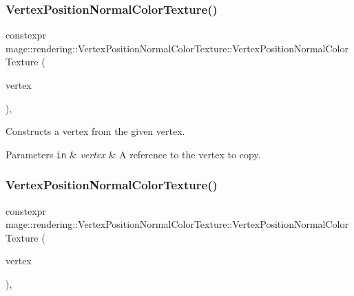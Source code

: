 \subsubsection{\texorpdfstring{Vertex\+Position\+Normal\+Color\+Texture()}{VertexPositionNormalColorTexture()}\hspace{0.1cm}{\footnotesize\ttfamily [3/4]}}
{\footnotesize\ttfamily constexpr mage\+::rendering\+::\+Vertex\+Position\+Normal\+Color\+Texture\+::\+Vertex\+Position\+Normal\+Color\+Texture (\begin{DoxyParamCaption}\item[{const \hyperlink{structmage_1_1rendering_1_1_vertex_position_normal_color_texture}{Vertex\+Position\+Normal\+Color\+Texture} \&}]{vertex }\end{DoxyParamCaption})\hspace{0.3cm}{\ttfamily [default]}, {\ttfamily [noexcept]}}

Constructs a vertex from the given vertex.


\begin{DoxyParams}[1]{Parameters}
\mbox{\tt in}  & {\em vertex} & A reference to the vertex to copy. \\
\hline
\end{DoxyParams}
\hypertarget{structmage_1_1rendering_1_1_vertex_position_normal_color_texture_a78fbb9ec2a5c4b26ab789c966ba89e64}{}\label{structmage_1_1rendering_1_1_vertex_position_normal_color_texture_a78fbb9ec2a5c4b26ab789c966ba89e64} 
\subsubsection{\texorpdfstring{Vertex\+Position\+Normal\+Color\+Texture()}{VertexPositionNormalColorTexture()}\hspace{0.1cm}{\footnotesize\ttfamily [4/4]}}
{\footnotesize\ttfamily constexpr mage\+::rendering\+::\+Vertex\+Position\+Normal\+Color\+Texture\+::\+Vertex\+Position\+Normal\+Color\+Texture (\begin{DoxyParamCaption}\item[{\hyperlink{structmage_1_1rendering_1_1_vertex_position_normal_color_texture}{Vertex\+Position\+Normal\+Color\+Texture} \&\&}]{vertex }\end{DoxyParamCaption})\hspace{0.3cm}{\ttfamily [default]}, {\ttfamily [noexcept]}}

